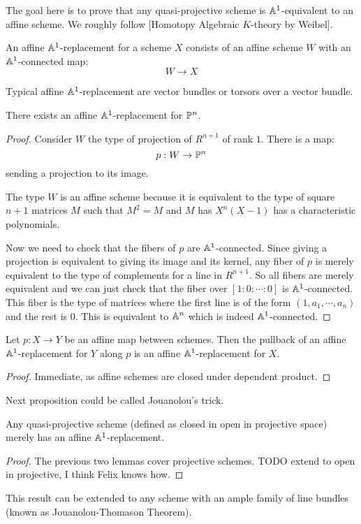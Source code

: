 The goal here is to prove that any quasi-projective scheme is $\mathbb{A}^1$-equivalent to an affine scheme. We roughly follow [Homotopy Algebraic $K$-theory by Weibel].

\begin{definition}
An affine $\mathbb{A}^1$-replacement for a scheme $X$ consists of an affine scheme $W$ with an $\mathbb{A}^1$-connected map:
\[W\to X\]
\end{definition}

Typical affine $\mathbb{A}^1$-replacement are vector bundles or torsors over a vector bundle.

\begin{lemma}
There exists an affine $\mathbb{A}^1$-replacement for $\mathbb{P}^n$.
\end{lemma}

\begin{proof}
Consider $W$ the type of projection of $R^{n+1}$ of rank $1$. There is a map:
\[p:W\to \mathbb{P}^n\] 
sending a projection to its image.

The type $W$ is an affine scheme because it is equivalent to the type of square $n+1$ matrices $M$ such that $M^2=M$ and $M$ has $X^n(X-1)$ has a characteristic polynomials. 

Now we need to check that the fibers of $p$ are $\mathbb{A}^1$-connected. Since giving a projection is equivalent to giving its image and its kernel, any fiber of $p$ is merely equivalent to the type of complements for a line in $R^{n+1}$. So all fibers are merely equivalent and we can just check that the fiber over $[1:0:\cdots:0]$ is $\mathbb{A}^1$-connected. This fiber is the type of matrices where the first line is of the form $(1,a_1,\cdots,a_n)$ and the rest is $0$. This is equivalent to $\mathbb{A}^n$ which is indeed $\mathbb{A}^1$-connected.
\end{proof}

\begin{lemma}
Let $p:X\to Y$ be an affine map between schemes. Then the pullback of an affine $\mathbb{A}^1$-replacement for $Y$ along $p$ is an affine $\mathbb{A}^1$-replacement for $X$.
\end{lemma}

\begin{proof}
Immediate, as affine schemes are closed under dependent product.
\end{proof}

Next proposition could be called Jouanolou's trick.

\begin{proposition}
Any quasi-projective scheme (defined as closed in open in projective space) merely has an affine $\mathbb{A}^1$-replacement.
\end{proposition}

\begin{proof}
The previous two lemmas cover projective schemes. TODO extend to open in projective, I think Felix knows how.
\end{proof}

\begin{remark}
This result can be extended to any scheme with an ample family of line bundles (known as Jouanolou-Thomason Theorem).
\end{remark}


